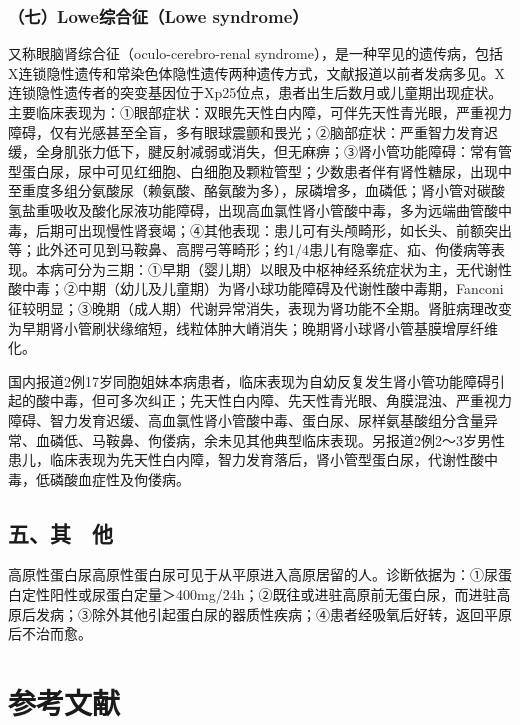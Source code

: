 \subsubsection{（七）Lowe综合征（Lowe syndrome）}

又称眼脑肾综合征（oculo-cerebro-renal
syndrome），是一种罕见的遗传病，包括X连锁隐性遗传和常染色体隐性遗传两种遗传方式，文献报道以前者发病多见。X连锁隐性遗传者的突变基因位于Xp25位点，患者出生后数月或儿童期出现症状。主要临床表现为：①眼部症状：双眼先天性白内障，可伴先天性青光眼，严重视力障碍，仅有光感甚至全盲，多有眼球震颤和畏光；②脑部症状：严重智力发育迟缓，全身肌张力低下，腱反射减弱或消失，但无麻痹；③肾小管功能障碍：常有管型蛋白尿，尿中可见红细胞、白细胞及颗粒管型；少数患者伴有肾性糖尿，出现中至重度多组分氨酸尿（赖氨酸、酪氨酸为多），尿磷增多，血磷低；肾小管对碳酸氢盐重吸收及酸化尿液功能障碍，出现高血氯性肾小管酸中毒，多为远端曲管酸中毒，后期可出现慢性肾衰竭；④其他表现：患儿可有头颅畸形，如长头、前额突出等；此外还可见到马鞍鼻、高腭弓等畸形；约1/4患儿有隐睾症、疝、佝偻病等表现。本病可分为三期：①早期（婴儿期）以眼及中枢神经系统症状为主，无代谢性酸中毒；②中期（幼儿及儿童期）为肾小球功能障碍及代谢性酸中毒期，Fanconi征较明显；③晚期（成人期）代谢异常消失，表现为肾功能不全期。肾脏病理改变为早期肾小管刷状缘缩短，线粒体肿大嵴消失；晚期肾小球肾小管基膜增厚纤维化。

国内报道2例17岁同胞姐妹本病患者，临床表现为自幼反复发生肾小管功能障碍引起的酸中毒，但可多次纠正；先天性白内障、先天性青光眼、角膜混浊、严重视力障碍、智力发育迟缓、高血氯性肾小管酸中毒、蛋白尿、尿样氨基酸组分含量异常、血磷低、马鞍鼻、佝偻病，余未见其他典型临床表现。另报道2例2～3岁男性患儿，临床表现为先天性白内障，智力发育落后，肾小管型蛋白尿，代谢性酸中毒，低磷酸血症性及佝偻病。

\protect\hypertarget{text00295.html}{}{}

\subsection{五、其　他}

高原性蛋白尿高原性蛋白尿可见于从平原进入高原居留的人。诊断依据为：①尿蛋白定性阳性或尿蛋白定量＞400mg/24h；②既往或进驻高原前无蛋白尿，而进驻高原后发病；③除外其他引起蛋白尿的器质性疾病；④患者经吸氧后好转，返回平原后不治而愈。

\protect\hypertarget{text00296.html}{}{}

\section{参考文献}

